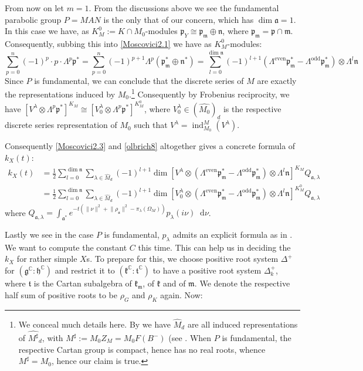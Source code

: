 \documentclass[11pt]{report}
\theoremstyle{definition}
\theoremstyle{plain}
\DeclareMathOperator{\ind}{ind}
\newcommand{\complex}{\mathbb{C}}
\newcommand{\even}{\mathrm{even}}
\newcommand{\odd}{\mathrm{odd}}
\renewcommand{\hat}{\widehat}
\newcommand{\norm}[1]{\lVert #1 \rVert}
\newcommand{\mass}[1]{\mathop{}\mathrm{d}{#1}}
\newcommand{\Lie}[1]{\mathfrak{#1}}
\begin{document}
\bigskip

From now on let $m=1$. From the discussions above we see the fundamental parabolic group $P=MAN$ is the only that of our concern, which has $\dim \Lie{a}=1$. In this case we have, as $K_M^0:=K\cap M_0$-modules $\Lie{p}_Y\cong \Lie{p}_\Lie{m}\oplus \Lie{n}$, where $\Lie{p}_\Lie{m}=\Lie{p}\cap \Lie{m}$. Consequently, subbing this into \ref{Moscovici2.1} we have as $K_M^0$-modules:
\begin{equation}\label{Moscovici2.3}
\sum^{n}_{p=0}(-1)^p\cdot p\cdot \Lambda^p\Lie{p}^*=\sum_{p=0}^{n}(-1)^{p+1}\Lambda^p(\Lie{p}_\Lie{m}^*\oplus \Lie{n}^*)=\sum_{l=0}^{\dim\Lie{n}}(-1)^{l+1}(\Lambda^{\even}\Lie{p}_\Lie{m}^*-\Lambda^\odd\Lie{p}_\Lie{m}^*)\otimes \Lambda^l\Lie{n}
\end{equation}
Since $P$ is fundamental, we can conclude that the discrete series of $M$ are exactly the representations induced by $M_0$.\footnote{We conceal much details here. By \cite[Proposition~12.32]{knapp2016} we have $\hat{M}_d$ are all induced representations of $\hat{M^\sharp}_d$, with $M^\sharp:=M_0Z_M=M_0F(B^-)$ (see \cite[Lemma 12.30(1)]{knapp2016}. When $P$ is fundamental, the respective Cartan group is compact, hence has no real roots, whence $M^\sharp=M_0$, hence our claim is true.} Consequently by Frobenius reciprocity, we have $[V^\lambda\otimes \Lambda^p\Lie{p}^*]^{K_M}\cong [V^\lambda_0\otimes \Lambda^p\Lie{p}^*]^{K_M^0}$, where $V^\lambda_0\in (\hat{M_0})_d$ is the respective discrete series representation of $M_0$ such that $V^\lambda=\ind^{M}_{M_0}(V^\lambda)$. 
\par Consequently \ref{Moscovici2.3} and \ref{olbrich8} altogether gives a concrete formula of $k_X(t)$:
\begin{equation}\label{olbrich15}
\begin{split}
k_X(t)&=\frac{1}{2}\sum^{\dim \Lie{n}}_{l=0}\sum_{\lambda\in \hat{M}_d}(-1)^{l+1}\dim [V^\lambda\otimes (\Lambda^{\even}\Lie{p}_\Lie{m}^*-\Lambda^\odd\Lie{p}_\Lie{m}^*)\otimes \Lambda^l\Lie{n}]^{K_M}Q_{\Lie{a}, \lambda}\\
&=\frac{1}{2}\sum^{\dim \Lie{n}}_{l=0}\sum_{\lambda\in \hat{M}_d}(-1)^{l+1}\dim [V^\lambda_0\otimes (\Lambda^{\even}\Lie{p}_\Lie{m}^*-\Lambda^\odd\Lie{p}_\Lie{m}^*)\otimes \Lambda^l\Lie{n}]^{K_M^0}Q_{\Lie{a}, \lambda}
\end{split}
\end{equation}
where $Q_{\Lie{a}, \lambda}=\int_{\Lie{a}^*}e^{-t(\norm{\nu}^2+\norm{\rho_{\Lie{a}}}^2-\pi_\lambda(\Omega_M))}p_\lambda(i\nu)\mass{\nu}$.
\par Lastly we see in the case $P$ is fundamental, $p_\lambda$ admits an explicit formula as in . We want to compute the constant $C$ this time. This can help us in deciding the $k_X$ for rather simple $X$s. To prepare for this, we choose positive root system $\Delta^+$ for $(\Lie{g}^\complex:\Lie{h}^\complex)$ and restrict it to $(\Lie{k}^\complex: \Lie{t}^\complex)$ to have a positive root system $\Delta^+_k$, where $\Lie{t}$ is the Cartan subalgebra of $\Lie{k_m}$, of $\Lie{k}$ and of $\Lie{m}$. We denote the respective half sum of positive roots to be $\rho_{G}$ and $\rho_{K}$ again. Now:
\end{document}

